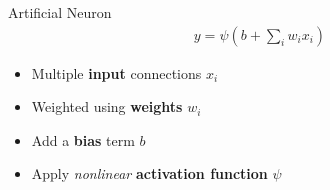 \documentclass[ignorenonframetext,xcolor=x11names]{beamer}
\begin{document}
\begin{frame}{Artificial Neuron}
\begin{align*}
y = \psi( b + \sum_i w_i x_i )
\end{align*}
\begin{itemize}
   \item Multiple \textbf{input} connections $x_i$
   \item Weighted using \textbf{weights} $w_i$
   \item Add a \textbf{bias} term $b$
   \item Apply \emph{nonlinear} \textbf{activation function} $\psi$
\end{itemize}
\end{frame}


\end{document}

